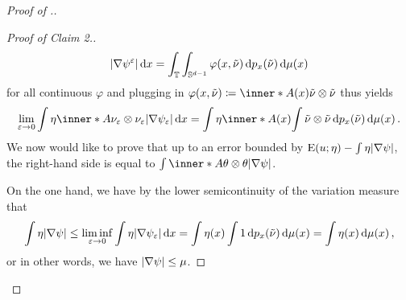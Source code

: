 \begin{proof}[Proof of .]
\begin{proof}[Proof of Claim 2.]
\begin{equation*}
			\abs{ \nabla \psi^{ \varepsilon } }
			\dd{ x }
			=
			\int_{ \operatorname{\mathbb{T}} }
			\int_{ \mathbb{ S }^{ d - 1 } }
			\varphi ( x, \tilde{ \nu } )
			\dd{ p_{ x } ( \tilde{ \nu } ) }
			\dd{ \mu ( x ) }
		\end{equation*} 
		for all continuous $ \varphi $ and plugging in $ \varphi ( x , \tilde{ 
			\nu } ) \coloneqq \inner*{ A ( x ) }{ \tilde{ \nu } \otimes \tilde{ 
			\nu 
		} } $ thus yields
		\begin{equation*}
			\lim_{ \varepsilon \to 0}
			\int
			\eta
			\inner*{ A }{ \nu_{ \varepsilon } \otimes \nu_{ \varepsilon 
			} }
			\abs{ \nabla \psi_{ \varepsilon } }
			\dd{ x }
			=
			\int
			\eta
			\inner*{ A ( x ) }
			{
				\int
				\tilde{ \nu } \otimes \tilde{ \nu }
				\dd{ p_{ x } ( \tilde{ \nu } ) }
			}
			\dd{ \mu ( x ) }.
		\end{equation*}
		We now would like to prove that up to an error bounded by $ \operatorname{E} ( u 
		; \eta ) - \int \eta \abs{ \nabla \psi } $, the right-hand side is 
		equal to $ \int \inner*{ A }{ \theta \otimes \theta } \abs{ \nabla \psi 
		} $.
		
		On the one hand, we have by the lower semicontinuity of the variation 
		measure that
		\begin{equation}
			\label{mu_doominates_variation_of_psi}
			\int
			\eta
			\abs{ \nabla \psi }
			\leq
			\liminf_{ \varepsilon \to 0 }
			\int
			\eta
			\abs{ \nabla \psi_{ \varepsilon } }
			\dd{ x }
			=
			\int
			\eta ( x )
			\int
			1
			\dd{ p_{ x } ( \tilde{ \nu } ) }
			\dd{ \mu ( x ) }
			=
			\int
			\eta ( x ) 
			\dd{ \mu ( x ) },
		\end{equation}
		or in other words, we have $ \abs{ \nabla \psi } \leq \mu $.
		

\end{proof}
\end{proof}
